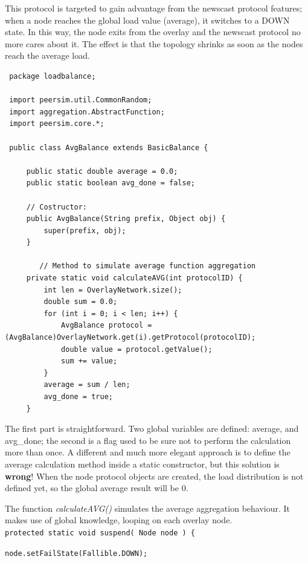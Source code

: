 \documentclass[a4paper,11pt]{article}
\begin{document}
This protocol is targeted to gain advantage from the newscast protocol
features; when a node reaches the global load value (average), it
switches to a DOWN state. In this way, the node exits from the overlay
and the newscast protocol no more cares about it. The effect is that
the topology shrinks as soon as the nodes reach the average load.
\\

\footnotesize
\begin{verbatim}
 package loadbalance;
 
 import peersim.util.CommonRandom;
 import aggregation.AbstractFunction;
 import peersim.core.*;
 
 public class AvgBalance extends BasicBalance {
 
     public static double average = 0.0;
     public static boolean avg_done = false;
     
     // Costructor:
     public AvgBalance(String prefix, Object obj) {
         super(prefix, obj);
     }
 
        // Method to simulate average function aggregation
     private static void calculateAVG(int protocolID) {
         int len = OverlayNetwork.size();
         double sum = 0.0;
         for (int i = 0; i < len; i++) {
             AvgBalance protocol = (AvgBalance)OverlayNetwork.get(i).getProtocol(protocolID);
             double value = protocol.getValue();
             sum += value;
         }
         average = sum / len;
         avg_done = true;
     }
\end{verbatim}
\normalsize


The first part is straightforward. Two global variables are defined:
average, and avg\_done; the second is a flag used to be sure not to
perform the calculation more than once. A different and much more
elegant approach is to define the average calculation method inside
a static constructor, but this solution is \textbf{wrong}! When the
node protocol objects are created, the load distribution is not defined
yet, so the global average result will be 0.

The function \emph{calculateAVG()} simulates the average aggregation
behaviour. It makes use of global knowledge, looping on each overlay
node. \\


\texttt{\footnotesize protected static void suspend( Node node ) \{}{\footnotesize \par}

\texttt{\footnotesize node.setFailState(Fallible.DOWN); }{\footnotesize \par}
\end{document}
